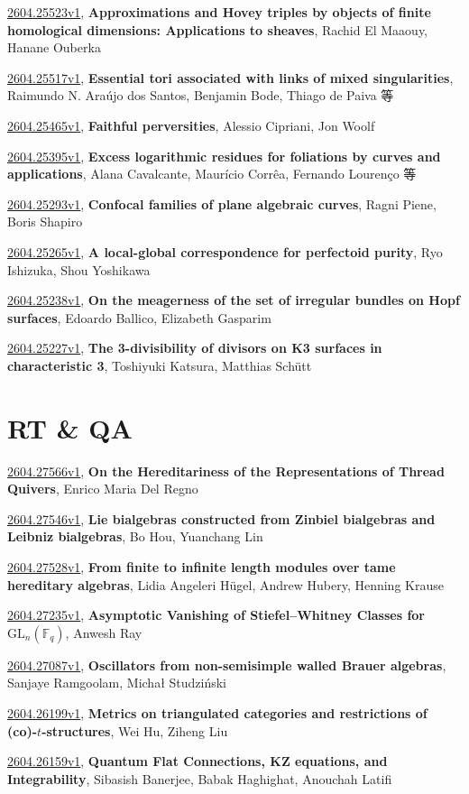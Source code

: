 \documentclass[9pt, a4paper]{article}
\theoremstyle{plain}
\theoremstyle{definition}
\theoremstyle{remark}
\newcommand{\arxiv}[3]{\href{https://arxiv.org/abs/#1}{#1}, \textbf{\textcolor{arxivblue}{#2}}, #3}
\begin{document}
\arxiv{2604.25523v1}{Approximations and Hovey triples by objects of finite homological dimensions: Applications to sheaves}{Rachid El Maaouy, Hanane Ouberka}

\arxiv{2604.25517v1}{Essential tori associated with links of mixed singularities}{Raimundo N. Araújo dos Santos, Benjamin Bode, Thiago de Paiva 等}

\arxiv{2604.25465v1}{Faithful perversities}{Alessio Cipriani, Jon Woolf}

\arxiv{2604.25395v1}{Excess logarithmic residues for foliations by curves and applications}{Alana Cavalcante, Maurício Corrêa, Fernando Lourenço 等}

\arxiv{2604.25293v1}{Confocal families of plane algebraic curves}{Ragni Piene, Boris Shapiro}

\arxiv{2604.25265v1}{A local-global correspondence for perfectoid purity}{Ryo Ishizuka, Shou Yoshikawa}

\arxiv{2604.25238v1}{On the meagerness of the set of irregular bundles on Hopf surfaces}{Edoardo Ballico, Elizabeth Gasparim}

\arxiv{2604.25227v1}{The 3-divisibility of divisors on K3 surfaces in characteristic 3}{Toshiyuki Katsura, Matthias Schütt}


\section{RT \& QA}
\arxiv{2604.27566v1}{On the Hereditariness of the Representations of Thread Quivers}{Enrico Maria Del Regno}

\arxiv{2604.27546v1}{Lie bialgebras constructed from Zinbiel bialgebras and Leibniz bialgebras}{Bo Hou, Yuanchang Lin}

\arxiv{2604.27528v1}{From finite to infinite length modules over tame hereditary algebras}{Lidia Angeleri Hügel, Andrew Hubery, Henning Krause}

\arxiv{2604.27235v1}{Asymptotic Vanishing of Stiefel--Whitney Classes for $\mathrm{GL}_n(\mathbb{F}_q)$}{Anwesh Ray}

\arxiv{2604.27087v1}{Oscillators from non-semisimple walled Brauer algebras}{Sanjaye Ramgoolam, Michał Studziński}

\arxiv{2604.26199v1}{Metrics on triangulated categories and restrictions of (co)-$t$-structures}{Wei Hu, Ziheng Liu}

\arxiv{2604.26159v1}{Quantum Flat Connections, KZ equations, and Integrability}{Sibasish Banerjee, Babak Haghighat, Anouchah Latifi}
\end{document}
